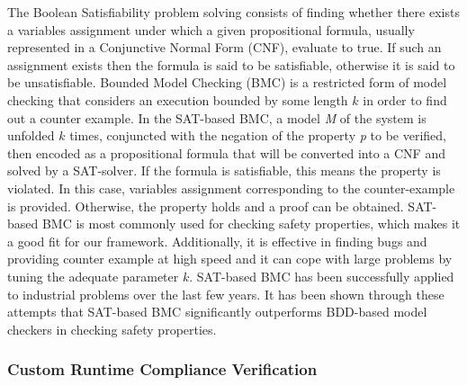 \documentclass[12pt]{article}
\begin{document}
The Boolean Satisfiability problem solving consists of finding whether
there exists a variables assignment under which a given propositional
formula, usually represented in a Conjunctive Normal Form (CNF),
evaluate to true. If such an assignment exists then the formula is
said to be satisfiable, otherwise it is said to be unsatisfiable.
Bounded Model Checking (BMC) is a restricted form of model checking
that considers an execution bounded by some length $k$ in order to
find out a counter example. In the SAT-based BMC, a model \textit {M}
of the system is unfolded $k$ times, conjuncted with the negation of
the property \textit{p} to be verified, then encoded as a
propositional formula that will be converted into a CNF and solved by
a SAT-solver. If the formula is satisfiable, this means  the
property is violated. In this case, variables assignment corresponding
to the counter-example is provided. Otherwise, the property holds and
a proof can be obtained.  SAT-based BMC is most commonly used for
checking safety properties, which makes it a good fit for our
framework. Additionally, it is effective in finding bugs and providing
counter example at high speed and it can cope with large problems by
tuning the adequate parameter $k$.  SAT-based BMC has been
successfully applied to industrial problems over the last few
years. It has been shown through these attempts that SAT-based BMC
significantly outperforms BDD-based model checkers in checking safety
properties.



\vspace{-3mm}
\subsubsection{Custom Runtime Compliance Verification}
\label{subsec:cusalgo}
\vspace{-2mm} 
\end{document}
